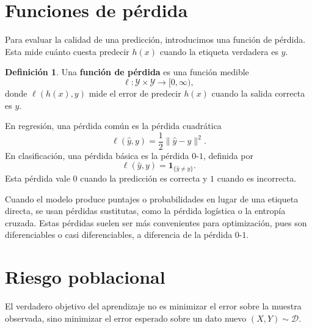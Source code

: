 \documentclass[11pt]{report}
\newenvironment{tcolorbox}[1][]{\par\medskip\noindent\ignorespaces}{\par\medskip}
\theoremstyle{definition}
\newtheorem{definicion}{Definición}[section]
\theoremstyle{plain}
\numberwithin{equation}{section}
\begin{document}
\section{Funciones de pérdida}

Para evaluar la calidad de una predicción, introducimos una función de pérdida. Esta mide cuánto cuesta predecir \(h(x)\) cuando la etiqueta verdadera es \(y\).

\begin{tcolorbox}[colback=blue!8, colframe=blue!8, boxrule=0pt]
\begin{definicion}
Una \textbf{función de pérdida} es una función medible
\begin{equation*}
    \ell:\mathcal{Y}\times\mathcal{Y}\to[0,\infty),
\end{equation*}
donde \(\ell(h(x),y)\) mide el error de predecir \(h(x)\) cuando la salida correcta es \(y\).
\end{definicion}
\end{tcolorbox}

En regresión, una pérdida común es la pérdida cuadrática
\begin{equation*}
    \ell(\widehat{y},y)
    =
    \frac{1}{2}\|\widehat{y}-y\|^2.
\end{equation*}
En clasificación, una pérdida básica es la pérdida \(0\)-\(1\), definida por
\begin{equation*}
    \ell(\widehat{y},y)
    =
    \mathbf{1}_{\{\widehat{y}\neq y\}}.
\end{equation*}
Esta pérdida vale \(0\) cuando la predicción es correcta y \(1\) cuando es incorrecta.

Cuando el modelo produce puntajes o probabilidades en lugar de una etiqueta directa, se usan pérdidas sustitutas, como la pérdida logística o la entropía cruzada. Estas pérdidas suelen ser más convenientes para optimización, pues son diferenciables o casi diferenciables, a diferencia de la pérdida \(0\)-\(1\).

\section{Riesgo poblacional}

El verdadero objetivo del aprendizaje no es minimizar el error sobre la muestra observada, sino minimizar el error esperado sobre un dato nuevo \((X,Y)\sim\mathcal{D}\).
\end{document}
